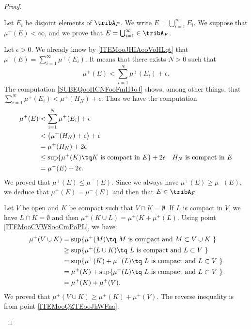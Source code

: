 \begin{proof}
\begin{subproof}
         Let \( E_i\) be disjoint elements of \( \tribA_F\). We write \( E=\bigcup_{i=1}^{\infty}E_i\). We suppose that \( \mu^+(E)<\infty\), and we prove that \( E=\bigcup_{i=1}^{\infty}\in \tribA_F\).

         Let \( \epsilon>0\). We already know by \ref{ITEMooJHIAooVoHLqt} that \(  \mu^+(E)=\sum_{i=1}^{\infty}\mu^+(E_i)  \). It means that there exists \( N>0\) such that
         \begin{equation}
             \mu^+(E)<\sum_{i=1}^N\mu^+(E_i)+\epsilon.
         \end{equation}
          The computation \eqref{SUBEQooHCNFooFmHJoJ} shows, among other things, that \( \sum_{i=1}^N\mu^+(E_i)<\mu^+(H_N)+\epsilon\). Thus we have the computation
          \begin{subequations}
              \begin{align}
                  \mu^+(E)&<\sum_{i=1}^N\mu^+(E_i)+\epsilon\\
                  &<\big( \mu^+(H_N)+\epsilon \big)+\epsilon\\
                  &=\mu^+(H_N)+2\epsilon\\
                  &\leq \sup\{ \mu^+(K)\tq \text{\( K\) is compact in \( E\)} \}+2\epsilon    & \text{\( H_N\) is compact in \( E\)}\\
                  &=\mu^-(E)+2\epsilon.
              \end{align}
          \end{subequations}
          We proved that \( \mu^+(E)\leq \mu^-(E)\). Since we always have \( \mu^+(E)\geq \mu^-(E)\), we deduce that \( \mu^+(E)=\mu^-(E)\) and then that \( E\in \tribA_F\).

     \spitem[\( \mu^+(V\cup K)=\mu^+(V)+\mu^+(K)\) if \( V\cap K=\emptyset\)]         \label{ITEMooZSUIooPrPhtD}

         Let \( V\) be open and \( K\) be compact such that \( V\cap K=\emptyset\). If \( L\) is compact in \( V\), we have \( L\cap K=\emptyset \) and then \( \mu^+(K\cup L)=\mu^+(K+\mu^+(L)\). Using point \ref{ITEMooCVWSooCmPoPL}, we have:
         \begin{subequations}
             \begin{align}
                 \mu^+(V\cup K)&=\sup\{ \mu^+(M)\tq \text{  \( M\) is compact and \( M\subset V\cup K\) } \}\\
                 &\geq \sup\{ \mu^+(L\cup K)\tq \text{ \( L\) is compact and \( L\subset V\) } \}\\
                 &=\sup\{ \mu^+(K)+\mu^+(L)  \tq \text{ \( L\) is compact and \( L\subset V\) } \}\\
                 &= \mu^+(K)+ \sup\{\mu^+(L)  \tq \text{ \( L\) is compact and \( L\subset V\) } \}\\
                 &=\mu^+(K)+\mu^+(V).
             \end{align}
         \end{subequations}
         We proved that \( \mu^+(V\cup K)\geq \mu^+(K)+\mu^+(V)\). The reverse inequality is from point \ref{ITEMooQZTEooJhWFna}.


\end{subproof}
\end{proof}
